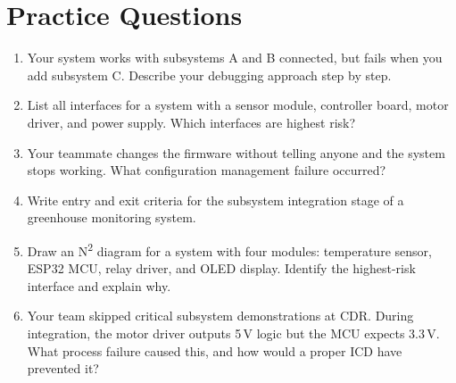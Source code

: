 \section{Practice Questions}
\begin{enumerate}[leftmargin=1.5em]
\item Your system works with subsystems A and B connected, but fails when you add subsystem C. Describe your debugging approach step by step.
\item List all interfaces for a system with a sensor module, controller board, motor driver, and power supply. Which interfaces are highest risk?
\item Your teammate changes the firmware without telling anyone and the system stops working. What configuration management failure occurred?
\item Write entry and exit criteria for the subsystem integration stage of a greenhouse monitoring system.
\item Draw an N\textsuperscript{2} diagram for a system with four modules: temperature sensor, ESP32 MCU, relay driver, and OLED display. Identify the highest-risk interface and explain why.
\item Your team skipped critical subsystem demonstrations at CDR. During integration, the motor driver outputs 5\,V logic but the MCU expects 3.3\,V. What process failure caused this, and how would a proper ICD have prevented it?
\end{enumerate}

